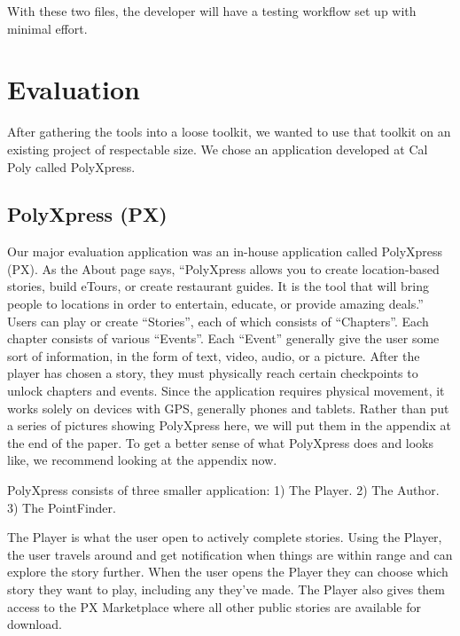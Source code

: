 \documentclass[12pt]{ucthesis}
\begin{document}
With these two files, the developer will have a testing workflow set up with minimal effort.


\chapter{Evaluation}
After gathering the tools into a loose toolkit, we wanted to use that toolkit on an existing project of respectable size. We chose an application developed at Cal Poly called PolyXpress.

\section{PolyXpress (PX)}
Our major evaluation application was an in-house application called PolyXpress (PX)\cite{PX}. As the About page says, ``PolyXpress allows you to create location-based stories, build eTours, or create restaurant guides. It is the tool that will bring people to locations in order to entertain, educate, or provide amazing deals.''\cite{PX} Users can play or create ``Stories'', each of which consists of ``Chapters''. Each chapter consists of various ``Events''. Each ``Event'' generally give the user some sort of information, in the form of text, video, audio, or a picture. After the player has chosen a story, they must physically reach certain checkpoints to unlock chapters and events. Since the application requires physical movement, it works solely on devices with GPS, generally phones and tablets. Rather than put a series of pictures showing PolyXpress here, we will put them in the appendix at the end of the paper. To get a better sense of what PolyXpress does and looks like, we recommend looking at the appendix now.

PolyXpress consists of three smaller application: 1) The Player. 2) The Author. 3) The PointFinder.

The Player is what the user open to actively complete stories. Using the Player, the user travels around and get notification when things are within range and can explore the story further. When the user opens the Player they can choose which story they want to play, including any they've made. The Player also gives them access to the PX Marketplace where all other public stories are available for download.
\end{document}
